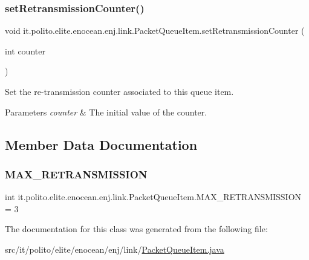 \subsubsection{\texorpdfstring{set\+Retransmission\+Counter()}{setRetransmissionCounter()}}
{\footnotesize\ttfamily void it.\+polito.\+elite.\+enocean.\+enj.\+link.\+Packet\+Queue\+Item.\+set\+Retransmission\+Counter (\begin{DoxyParamCaption}\item[{int}]{counter }\end{DoxyParamCaption})}

Set the re-\/transmission counter associated to this queue item.


\begin{DoxyParams}{Parameters}
{\em counter} & The initial value of the counter. \\
\hline
\end{DoxyParams}


\subsection{Member Data Documentation}
\hypertarget{classit_1_1polito_1_1elite_1_1enocean_1_1enj_1_1link_1_1_packet_queue_item_ad213f916f09ec73b7165e227e9674100}{}\label{classit_1_1polito_1_1elite_1_1enocean_1_1enj_1_1link_1_1_packet_queue_item_ad213f916f09ec73b7165e227e9674100} 
\subsubsection{\texorpdfstring{M\+A\+X\+\_\+\+R\+E\+T\+R\+A\+N\+S\+M\+I\+S\+S\+I\+ON}{MAX\_RETRANSMISSION}}
{\footnotesize\ttfamily int it.\+polito.\+elite.\+enocean.\+enj.\+link.\+Packet\+Queue\+Item.\+M\+A\+X\+\_\+\+R\+E\+T\+R\+A\+N\+S\+M\+I\+S\+S\+I\+ON = 3\hspace{0.3cm}{\ttfamily [static]}}



The documentation for this class was generated from the following file\+:\begin{DoxyCompactItemize}
\item 
src/it/polito/elite/enocean/enj/link/\hyperlink{_packet_queue_item_8java}{Packet\+Queue\+Item.\+java}\end{DoxyCompactItemize}
